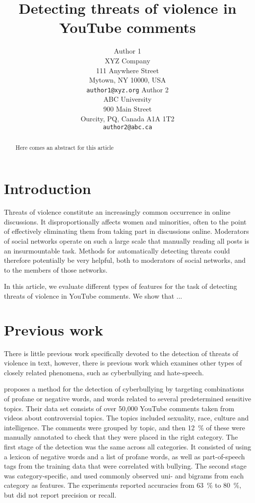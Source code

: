 \documentclass[11pt,letterpaper]{article}
\title{Detecting threats of violence in YouTube comments}
\author{Author 1\\
	    XYZ Company\\
	    111 Anywhere Street\\
	    Mytown, NY 10000, USA\\
	    {\tt author1@xyz.org}
	  \And
	Author 2\\
  	ABC University\\
  	900 Main Street\\
  	Ourcity, PQ, Canada A1A 1T2\\
  {\tt author2@abc.ca}}
\date{}
\begin{document}
\maketitle

\begin{abstract}
Here comes an abstract for this article
\end{abstract}

\section{Introduction}
\label{sec:intro}
Threats of violence constitute an increasingly common occurrence in online
discussions. It disproportionally affects women and minorities, often
to the point of effectively eliminating them from taking part in
discussions online. Moderators of social networks operate on such a
large scale that manually reading all posts is an insurmountable
task. Methods for automatically detecting threats could therefore
potentially be very helpful, both to moderators of social networks,
and to the members of those networks.

In this article, we evaluate different types of features for the task
of detecting threats of violence in YouTube comments. We show that ...

\section{Previous work}
\label{sec:prev}
There is little previous work specifically devoted to the detection of
threats of violence in text, however, there is previous work which
examines other types of closely related phenomena, such as
cyberbullying and hate-speech.

 proposes a method for the detection of
cyberbullying by targeting combinations of profane or negative words,
and words related to several predetermined sensitive topics. Their
data set consists of over 50,000 YouTube comments taken from videos
about controversial topics. The topics included sexuality, race,
culture and intelligence. The comments were grouped by topic, and then
12~\% of these were manually annotated to check that they were placed
in the right category.
The first stage of the detection was the same across all
categories. It consisted of using a lexicon of negative words and a
list of profane words, as well as part-of-speech tags from the
training data that were correlated with bullying. The second stage was
category-specific, and used commonly observed uni- and bigrams from
each category as features. The experiments reported accuracies from
63~\% to 80~\%, but did not report precision or recall.
\end{document}
